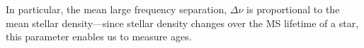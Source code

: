 \documentclass[10pt,preprint]{aastex}
\begin{document}
In particular, the mean large frequency separation, $\Delta\nu$ is proportional to the mean stellar density---since stellar density changes over the MS lifetime of a star, this parameter enables us to measure ages.

%
\end{document}
